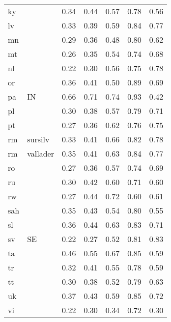 \begin{table}[H]
\begin{tabular}{llrrrrr}
  ky &  & 0.34 & 0.44 & 0.57 & 0.78 & 0.56 \\ 
  lv &  & 0.33 & 0.39 & 0.59 & 0.84 & 0.77 \\ 
  mn &  & 0.29 & 0.36 & 0.48 & 0.80 & 0.62 \\ 
  mt &  & 0.26 & 0.35 & 0.54 & 0.74 & 0.68 \\ 
  nl &  & 0.22 & 0.30 & 0.56 & 0.75 & 0.78 \\ 
  or &  & 0.36 & 0.41 & 0.50 & 0.89 & 0.69 \\ 
  pa & IN & 0.66 & 0.71 & 0.74 & 0.93 & 0.42 \\ 
  pl &  & 0.30 & 0.38 & 0.57 & 0.79 & 0.71 \\ 
  pt &  & 0.27 & 0.36 & 0.62 & 0.76 & 0.75 \\ 
  rm & sursilv & 0.33 & 0.41 & 0.66 & 0.82 & 0.78 \\ 
  rm & vallader & 0.35 & 0.41 & 0.63 & 0.84 & 0.77 \\ 
  ro &  & 0.27 & 0.36 & 0.57 & 0.74 & 0.69 \\ 
  ru &  & 0.30 & 0.42 & 0.60 & 0.71 & 0.60 \\ 
  rw &  & 0.27 & 0.44 & 0.72 & 0.60 & 0.61 \\ 
  sah &  & 0.35 & 0.43 & 0.54 & 0.80 & 0.55 \\ 
  sl &  & 0.36 & 0.44 & 0.63 & 0.83 & 0.71 \\ 
  sv & SE & 0.22 & 0.27 & 0.52 & 0.81 & 0.83 \\ 
  ta &  & 0.46 & 0.55 & 0.67 & 0.85 & 0.59 \\ 
  tr &  & 0.32 & 0.41 & 0.55 & 0.78 & 0.59 \\ 
  tt &  & 0.30 & 0.38 & 0.52 & 0.79 & 0.63 \\ 
  uk &  & 0.37 & 0.43 & 0.59 & 0.85 & 0.72 \\ 
  vi &  & 0.22 & 0.30 & 0.34 & 0.72 & 0.30 \\ 
   \hline
\end{tabular}
\end{table}

